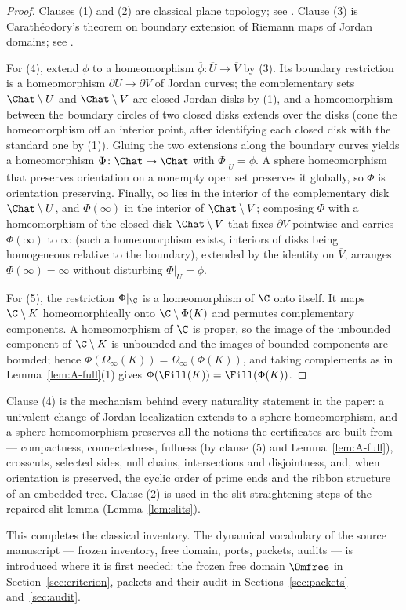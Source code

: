\begin{proof}
Clauses (1) and (2) are classical plane topology; see
\cite{New51,Why42}.  Clause (3) is Carath\'eodory's theorem on boundary
extension of Riemann maps of Jordan domains; see \cite{Pom92}.

For (4), extend $\phi$ to a homeomorphism
$\overline{\phi}\colon\overline{U}\to\overline{V}$ by (3).  Its boundary
restriction is a homeomorphism $\partial U\to\partial V$ of Jordan
curves; the complementary sets $\Chat\setminus U$ and $\Chat\setminus V$
are closed Jordan disks by (1), and a homeomorphism between the boundary
circles of two closed disks extends over the disks (cone the
homeomorphism off an interior point, after identifying each closed disk
with the standard one by (1)).  Gluing the two extensions along the
boundary curves yields a homeomorphism $\Phi\colon\Chat\to\Chat$ with
$\Phi|_U=\phi$.  A sphere homeomorphism that preserves orientation on a
nonempty open set preserves it globally, so $\Phi$ is orientation
preserving.  Finally, $\infty$ lies in the interior of the complementary
disk $\Chat\setminus U$, and $\Phi(\infty)$ in the interior of
$\Chat\setminus V$; composing $\Phi$ with a homeomorphism of the closed
disk $\Chat\setminus V$ that fixes $\partial V$ pointwise and carries
$\Phi(\infty)$ to $\infty$ (such a homeomorphism exists, interiors of
disks being homogeneous relative to the boundary), extended by the
identity on $\overline{V}$, arranges $\Phi(\infty)=\infty$ without
disturbing $\Phi|_U=\phi$.

For (5), the restriction $\Phi|_{\C}$ is a homeomorphism of $\C$ onto
itself.  It maps $\C\setminus K$ homeomorphically onto
$\C\setminus\Phi(K)$ and permutes complementary components.  A
homeomorphism of $\C$ is proper, so the image of the unbounded component
of $\C\setminus K$ is unbounded and the images of bounded components are
bounded; hence $\Phi(\Omega_\infty(K))=\Omega_\infty(\Phi(K))$, and
taking complements as in Lemma~\ref{lem:A-full}(1) gives
$\Phi(\Fill(K))=\Fill(\Phi(K))$.
\end{proof}

Clause (4) is the mechanism behind every naturality statement in the
paper: a univalent change of Jordan localization extends to a sphere
homeomorphism, and a sphere homeomorphism preserves all the notions the
certificates are built from --- compactness, connectedness, fullness (by
clause (5) and Lemma~\ref{lem:A-full}), crosscuts, selected sides, null
chains, intersections and disjointness, and, when orientation is
preserved, the cyclic order of prime ends and the ribbon structure of an
embedded tree.  Clause (2) is used in the slit-straightening steps of the
repaired slit lemma (Lemma~\ref{lem:slits}).

This completes the classical inventory.  The dynamical vocabulary of the
source manuscript --- frozen inventory, free domain, ports, packets,
audits --- is introduced where it is first needed:
the frozen free domain $\Omfree$ in Section~\ref{sec:criterion}, packets
and their audit in Sections~\ref{sec:packets} and~\ref{sec:audit}.
